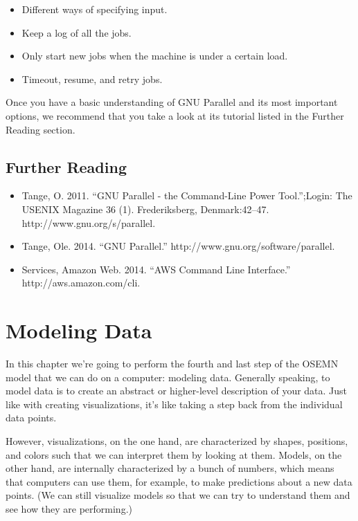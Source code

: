 \documentclass[
]{book}
\providecommand{\tightlist}{%
  \setlength{\itemsep}{0pt}\setlength{\parskip}{0pt}}
\theoremstyle{definition}
\theoremstyle{definition}
\theoremstyle{definition}
\theoremstyle{remark}
\begin{document}
\begin{itemize}
\tightlist
\item
  Different ways of specifying input.
\item
  Keep a log of all the jobs.
\item
  Only start new jobs when the machine is under a certain load.
\item
  Timeout, resume, and retry jobs.
\end{itemize}

Once you have a basic understanding of GNU Parallel and its most important options, we recommend that you take a look at its tutorial listed in the Further Reading section.

\hypertarget{further-reading}{%
\section{Further Reading}\label{further-reading}}

\begin{itemize}
\tightlist
\item
  Tange, O. 2011. ``GNU Parallel - the Command-Line Power Tool.'';Login: The USENIX Magazine 36 (1). Frederiksberg, Denmark:42--47. http://www.gnu.org/s/parallel.
\item
  Tange, Ole. 2014. ``GNU Parallel.'' http://www.gnu.org/software/parallel.
\item
  Services, Amazon Web. 2014. ``AWS Command Line Interface.'' http://aws.amazon.com/cli.
\end{itemize}

\hypertarget{chapter-9-modeling-data}{%
\chapter{Modeling Data}\label{chapter-9-modeling-data}}

In this chapter we're going to perform the fourth and last step of the OSEMN model that we can do on a computer: modeling data. Generally speaking, to model data is to create an abstract or higher-level description of your data. Just like with creating visualizations, it's like taking a step back from the individual data points.

However, visualizations, on the one hand, are characterized by shapes, positions, and colors such that we can interpret them by looking at them. Models, on the other hand, are internally characterized by a bunch of numbers, which means that computers can use them, for example, to make predictions about a new data points. (We can still visualize models so that we can try to understand them and see how they are performing.)
\end{document}
